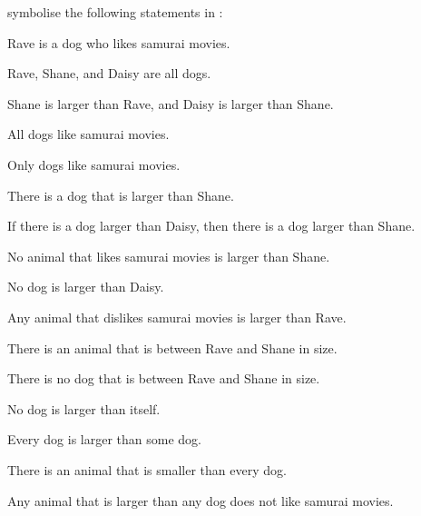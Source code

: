 \documentclass[PHIL101-Textbook.tex]{subfiles}
\begin{document}
symbolise the following statements in \pl:

\begin{earg}
\item Rave is a dog who likes samurai movies.
\item Rave, Shane, and Daisy are all dogs.
\item Shane is larger than Rave, and Daisy is larger than Shane.
\item All dogs like samurai movies.
\item Only dogs like samurai movies.
\item There is a dog that is larger than Shane.
\item If there is a dog larger than Daisy, then there is a dog larger than Shane.
\item No animal that likes samurai movies is larger than Shane.
\item No dog is larger than Daisy.
\item Any animal that dislikes samurai movies is larger than Rave.
\item There is an animal that is between Rave and Shane in size.
\item There is no dog that is between Rave and Shane in size.
\item No dog is larger than itself.
\item Every dog is larger than some dog.
\item There is an animal that is smaller than every dog.
\item Any animal that is larger than any dog does not like samurai movies.
\end{earg}
\end{document}
